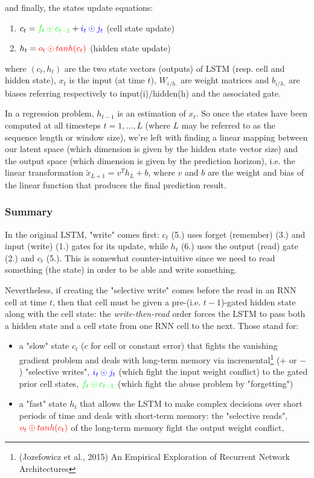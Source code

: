 \documentclass{article}
\begin{document}
and finally, the states update equations:
\begin{enumerate}
  \item $c_t=\textcolor{green}{f_t \odot c_{t-1}} + \textcolor{blue}{i_t \odot j_t}$ (cell state update)
  \item $h_t=\textcolor{red}{o_t \odot tanh(c_{t})}$ (hidden state update)
\end{enumerate}
\medskip

where $(c_t, h_t)$ are the two state vectors (outputs) of LSTM (resp. cell and hidden state), $x_t$ is the input (at time $t$), $W_{i/h.}$ are weight matrices and $b_{i/h.}$ are biases referring respectively to input(i)/hidden(h) and the associated gate.

In a regression problem, $h_{t-1}$ is an estimation of $x_t$. So once the states have been computed at all timesteps $t=1, \dots, L$ (where $L$ may be referred to as the sequence length or window size), we're left with finding a linear mapping between our latent space (which dimension is given by the hidden state vector size) and the output space (which dimension is given by the prediction horizon), i.e. the linear transformation $\widetilde{x}_{L+1} = v^T h_L + b$, where $v$ and $b$ are the weight and bias of the linear function that produces the final prediction result.


\subsubsection{Summary}
In the original LSTM, "write" comes first: $c_t$ (5.) uses forget (remember) (3.) and input (write) (1.) gates for its update, while $h_t$ (6.) uses the output (read) gate (2.) and $c_t$ (5.). This is somewhat counter-intuitive since we need to read something (the state) in order to be able and write something.

Nevertheless, if creating the "selective write" comes before the read in an RNN cell at time $t$, then that cell must be given a pre-(i.e. $t-1$)-gated hidden state along with the cell state: the \textit{write-then-read} order forces the LSTM to pass both a hidden state and a cell state from one RNN cell to the next. Those stand for:

\begin{itemize}[nosep]
  \item a "slow" state $c_t$ ($c$ for cell or constant error) that fights the vanishing gradient problem and deals with long-term memory via incremental\footnote{(Jozefowicz et al., 2015) An Empirical Exploration of Recurrent Network Architectures} ($+$ or $-$) "selective writes", $\textcolor{blue}{i_t \odot j_t}$ (which fight the input weight conflict) to the gated prior cell states, $\textcolor{green}{f_t \odot c_{t-1}}$ (which fight the abuse problem by "forgetting")
  \item a "fast" state $h_t$ that allows the LSTM to make complex decisions over short periods of time and deals with short-term memory: the "selective reads", $\textcolor{red}{o_t\odot tanh(c_t)}$ of the long-term memory fight the output weight conflict,
\end{itemize}
\end{document}
